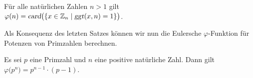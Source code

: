 \begin{Korollar} \label{korollar:phi}
F\"{u}r alle nat\"{u}rlichen Zahlen $n > 1$ gilt
\\[0.2cm]
\hspace*{1.3cm}
$\varphi(n) = \textsl{card}\bigl(\{x \in \mathbb{Z}_{n} \mid \textsl{ggt}(x, n) = 1 \}\bigr)$. 
\end{Korollar}


\noindent
Als Konsequenz des letzten Satzes k\"{o}nnen wir nun die Eulersche $\varphi$-Funktion f\"{u}r Potenzen von
Primzahlen berechnen.

\begin{Satz}
\label{satz:phi_primzahl} 
Es sei $p$ eine Primzahl und $n$ eine positive nat\"{u}rliche Zahl.  Dann gilt
\\[0.2cm]
\hspace*{1.3cm}
$\varphi\bigl(p^n\bigr) = p^{n-1} \cdot (p - 1)$.  
\end{Satz}

